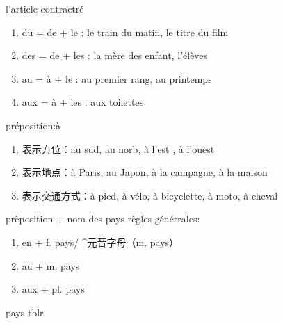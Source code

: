 \documentclass[../templates/main.tex]{subfiles}
\begin{document}
   \begin{grammar}{l'article contractré}
     \begin{enumerate}
       \item du = de + le : le train du matin, le titre du film 
       \item des = de + les : la mère des enfant, l'élèves 
       \item au = à + le : au premier rang, au printemps 
       \item aux = à + les : aux toilettes
     \end{enumerate}
   \end{grammar}
   \begin{grammar}{préposition:à}
     \begin{enumerate}
       \item 表示方位：au sud, au norb, à l'est , à l'ouest
       \item 表示地点：à Paris, au Japon, à la campagne, à la maison
       \item 表示交通方式：à pied, à vélo, à bicyclette, à moto, à cheval
     \end{enumerate}
   \end{grammar}
   \begin{grammar}{prèposition + nom des pays}
     règles générrales:
     \begin{enumerate}
       \item en + f. pays/ ^元音字母（m. pays） 
       \item au + m. pays 
       \item aux + pl. pays
     \end{enumerate}
   \end{grammar}
   \begin{grammar}{pays}
   tblr 
     
     
     
   \end{grammar}
   
\end{document}
